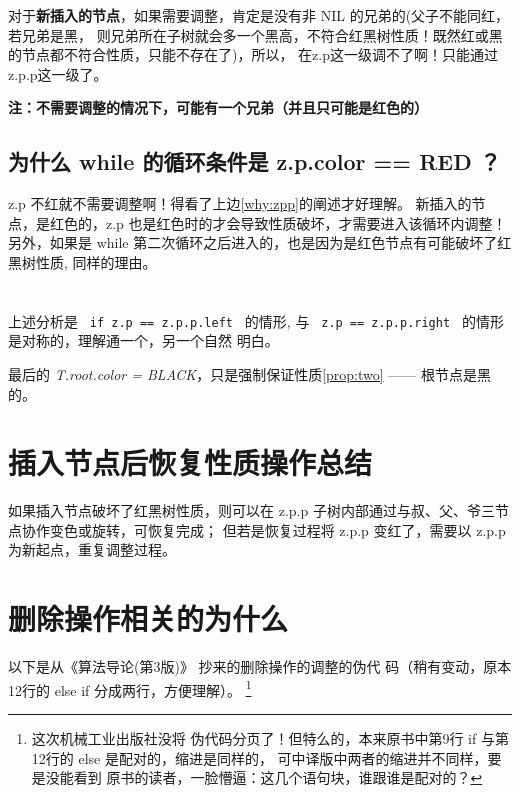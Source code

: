 \documentclass[a4paper, 11pt]{article}
\begin{document}
对于\textbf{新插入的节点}，如果需要调整，肯定是没有非 NIL 的兄弟的(父子不能同红，若兄弟是黑，
则兄弟所在子树就会多一个黑高，不符合红黑树性质！既然红或黑的节点都不符合性质，只能不存在了)，所以，
在z.p这一级调不了啊！只能通过 z.p.p这一级了。 \newline

\textbf{注：不需要调整的情况下，可能有一个兄弟（并且只可能是红色的）}

\subsection{为什么 while 的循环条件是 z.p.color == RED ？}
z.p 不红就不需要调整啊！得看了上边\ref{why:zpp}的阐述才好理解。
新插入的节点，是红色的，z.p 也是红色时的才会导致性质破坏，才需要进入该循环内调整！
另外，如果是 while 第二次循环之后进入的，也是因为是红色节点有可能破坏了红黑树性质, 同样的理由。

\section*{}
上述分析是 \verb| if z.p == z.p.p.left | 的情形, 与
\verb| z.p == z.p.p.right | 的情形是对称的，理解通一个，另一个自然
明白。 

最后的 \textit{T.root.color = BLACK}，只是强制保证性质\ref{prop:two} ------ 根节点是黑的。

\section{插入节点后恢复性质操作总结}
如果插入节点破坏了红黑树性质，则可以在 z.p.p 子树内部通过与叔、父、爷三节点协作变色或旋转，可恢复完成；
但若是恢复过程将 z.p.p 变红了，需要以 z.p.p 为新起点，重复调整过程。

\section{删除操作相关的为什么}
以下是从《算法导论(第3版)》\cite{algorithm:intro} 抄来的删除操作的调整的伪代
码（稍有变动，原本12行的 else if 分成两行，方便理解）。
\footnote{这次机械工业出版社没将
伪代码分页了！但特么的，本来原书中第9行 if 与第12行的 else 是配对的，缩进是同样的，
可中译版中两者的缩进并不同样，要是没能看到
原书的读者，一脸懵逼：这几个语句块，谁跟谁是配对的？}
\end{document}

